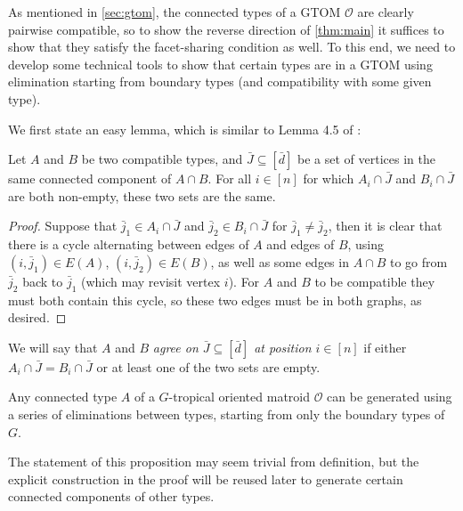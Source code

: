 \documentclass[letterpaper,reqno,11pt]{amsart}
\begin{document}
As mentioned in \cref{sec:gtom}, the connected types of a GTOM $\mathcal{O}$ are clearly pairwise compatible, so to show the reverse direction of \cref{thm:main} it suffices to show that they satisfy the facet-sharing condition as well. To this end, we need to develop some technical tools to show that certain types are in a GTOM using elimination starting from boundary types (and compatibility with some given type).


We first state an easy lemma, which is similar to Lemma 4.5 of \cite{ardila2007tropical}:

\begin{lemma}\label{lem:agree}
    Let $A$ and $B$ be two compatible types, and $\bar{J}\subseteq [\bar{d}]$ be a set of vertices in the same connected component of $A\cap B$. For all $i\in [n]$ for which $A_i\cap \bar{J}$ and $B_i\cap \bar{J}$ are both non-empty, these two sets are the same.
\end{lemma}

\begin{proof}
    Suppose that $\bar{j}_1 \in A_i\cap \bar{J}$ and $\bar{j}_2\in B_i\cap \bar{J}$ for $\bar{j}_1\neq \bar{j}_2$, then it is clear that there is a cycle alternating between edges of $A$ and edges of $B$, using $(i, \bar{j}_1)\in E(A)$, $(i, \bar{j}_2)\in E(B)$, as well as some edges in $A\cap B$ to go from $\bar{j}_2$ back to $\bar{j}_1$ (which may revisit vertex $i$). For $A$ and $B$ to be compatible they must both contain this cycle, so these two edges must be in both graphs, as desired.
\end{proof}

We will say that $A$ and $B$ \emph{agree on $\bar{J}\subseteq [\bar{d}]$ at position $i\in [n]$} if either $A_i\cap \bar{J} = B_i\cap \bar{J}$ or at least one of the two sets are empty.

\begin{proposition}\label{prop:generate}
    Any connected type $A$ of a $G$-tropical oriented matroid $\mathcal{O}$ can be generated using a series of eliminations between types, starting from only the boundary types of $G$.
\end{proposition}

The statement of this proposition may seem trivial from definition, but the explicit construction in the proof will be reused later to generate certain connected components of other types.
\end{document}
